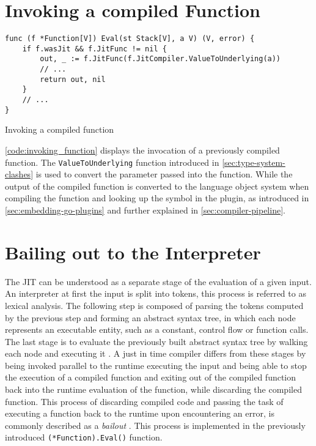 \section{Invoking a compiled Function}

\begin{listing}[H]
    \begin{verbatim}
func (f *Function[V]) Eval(st Stack[V], a V) (V, error) {
    if f.wasJit && f.JitFunc != nil {
        out, _ := f.JitFunc(f.JitCompiler.ValueToUnderlying(a))
        // ...
        return out, nil
    }
    // ...
}
    \end{verbatim}
    \caption{Invoking a compiled function}
    \label{code:invoking_function}
\end{listing}

\autoref{code:invoking_function} displays the invocation of a previously
compiled function. The \texttt{ValueToUnderlying} function introduced in
\autoref{sec:type-system-clashes} is used to convert the parameter passed
into the function. While the output of the compiled function is converted to
the language object system when compiling the function and looking up the
symbol in the plugin, as introduced in \autoref{sec:embedding-go-plugins}
and further explained in \autoref{sec:compiler-pipeline}. 

\section{Bailing out to the Interpreter}

The JIT can be understood as a separate stage of the evaluation of a given
input. An interpreter at first the input is split into tokens, this process is
referred to as lexical analysis. The following step is composed of parsing the
tokens computed by the previous step and forming an abstract syntax tree, in
which each node represents an executable entity, such as a constant, control
flow or function calls. The last stage is to evaluate the previously built
abstract syntax tree by walking each node and executing it
\cite{hippisley2010lexical}. A just in time compiler differs from these stages
by being invoked parallel to the runtime executing the input and being able to
stop the execution of a compiled function and exiting out of the compiled
function back into the runtime evaluation of the function, while discarding the
compiled function. This process of discarding compiled code and passing the
task of executing a function back to the runtime upon encountering an error, is
commonly described as a \textit{bailout} \cite{aycock2003brief}. This process
is implemented in the previously introduced \texttt{(*Function).Eval()}
function.


